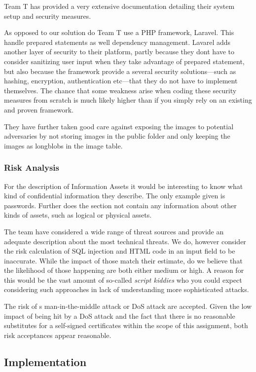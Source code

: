 \documentclass{article}
\begin{document}
Team T has provided a very extensive documentation detailing their system setup and security measures. 

As opposed to our solution do Team T use a PHP framework, Laravel. This handle prepared statements as well dependency management. Lavarel adds another layer of security to their platform, partly because they dont have to consider sanitizing user input when they take advantage of prepared statement, but also because the framework provide a several security solutions---such as hashing, encryption, authentication etc---that they do not have to implement themselves. The chance that some weakness arise when coding these security measures from scratch is much likely higher than if you simply rely on an existing and proven framework. 

They have further taken good care against exposing the images to potential adversaries by not storing images in the public folder and only keeping the images as longblobs in the image table. 

\subsubsection{Risk Analysis}
For the description of Information Assets it would be interesting to know what kind of confidential information they describe. The only example given is passwords. Further does the section not contain any information about other kinds of assets, such as logical or physical assets. 

The team have considered a wide range of threat sources and provide an adequate description about the most technical threats. We do, however consider the risk calculation of SQL injection and HTML code in an input field to be inaccurate. While the impact of those match their estimate, do we believe that the likelihood of those happening are both either medium or high. A reason for this would be the vast amount of so-called \emph{script kiddies} who you could expect considering such approaches in lack of understanding more sophisticated attacks. 

The risk of s man-in-the-middle attack or DoS attack are accepted. Given the low impact of being hit by a DoS attack and the fact that there is no reasonable substitutes for a self-signed certificates within the scope of this assignment, both risk acceptances appear reasonable. 

\subsection{Implementation}
\end{document}
